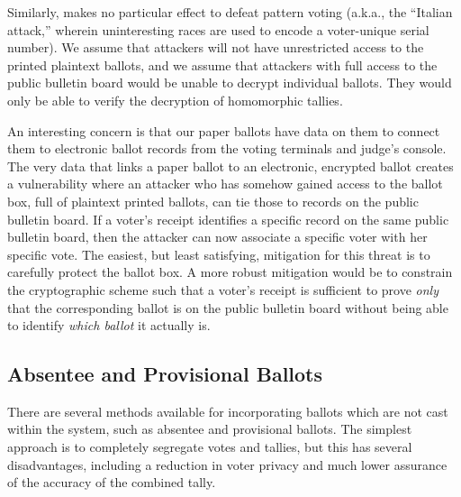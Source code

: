 Similarly, \projname makes no particular effect to defeat pattern voting (a.k.a., the ``Italian attack,'' wherein uninteresting races are used to encode a voter-unique serial number). We assume that attackers will not have unrestricted access to the printed plaintext ballots, and we assume that attackers with full access to the public bulletin board would be unable to decrypt individual ballots. They would only be able to verify the decryption of homomorphic tallies.

An interesting concern is that our paper ballots have data on them to connect them to electronic ballot records from the voting terminals and judge's console. The very data that links a paper ballot to an electronic, encrypted ballot creates a vulnerability where an attacker who has somehow gained access to the ballot box, full of plaintext printed ballots, can tie those to records on the public bulletin board. If a voter's receipt identifies a specific record on the same public bulletin board, then the attacker can now associate a specific voter with her specific vote. The easiest, but least satisfying, mitigation for this threat is to carefully protect the ballot box. A more robust mitigation would be to constrain the cryptographic scheme such that a voter's receipt is sufficient to prove {\em only} that the corresponding ballot is on the public bulletin board without being able to identify {\em which ballot} it actually is.




\subsection{Absentee and Provisional Ballots}
There are several methods available for incorporating ballots which are not cast within the \projname system, such as absentee and provisional ballots.  The simplest approach is to completely segregate votes and tallies, but this has several disadvantages, including a reduction in voter privacy and much lower assurance of the accuracy of the combined tally.

